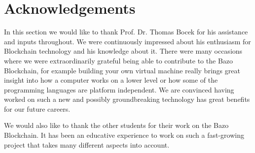\chapter*{Acknowledgements}
\thispagestyle{main} %
	In this section we would like to thank Prof. Dr. Thomas Bocek for his assistance and inputs throughout. We were continuously impressed about his enthusiasm for Blockchain technology and his knowledge about it. There were many occasions where we were extraordinarily grateful being able to contribute to the Bazo Blockchain, for example building your own virtual machine really brings great insight into how a computer works on a lower level or how some of the programming languages are platform independent. We are convinced having worked on such a new and possibly groundbreaking technology has great benefits for our future careers.
	
	We would also like to thank the other students for their work on the Bazo Blockchain. It has been an educative experience to work on such a fast-growing project that takes many different aspects into account.